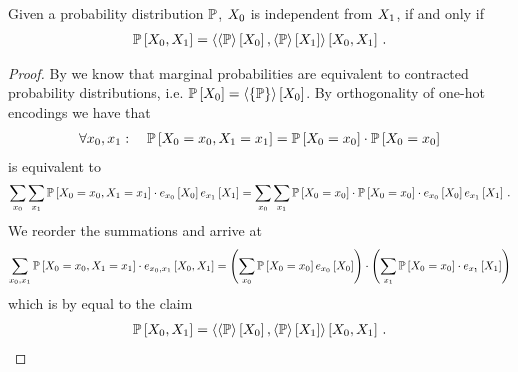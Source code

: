 \begin{theorem}\label{the:independenceProductCriterion}
	Given a probability distribution $\mathbb{P}$, $X_{0}$ is independent from $X_{1}$, if and only if 
	\begin{align*}
		\mathbb{P}\left[X_{0},X_{1}\right] 
		= \left\langle \left\langle \mathbb{P}\right\rangle \left[ X_{0} \right],\left\langle \mathbb{P}\right\rangle \left[ X_{1} \right]\right\rangle \left[ X_{0},X_{1} \right] \, . 
	\end{align*}
\end{theorem}
\begin{proof}
	By  we know that marginal probabilities are equivalent to contracted probability distributions, i.e. $\mathbb{P}\left[X_{0}\right] = \left\langle \{\mathbb{P}\}\right\rangle \left[ X_{0} \right] $.
	By orthogonality of one-hot encodings we have that
	\begin{align*}
		\forall x_{0}, x_{1} : \quad  \mathbb{P}\left[X_{0}=x_{0},X_{1}=x_{1}\right] 
		= \mathbb{P}\left[X_{0}=x_{0}\right]
		 \cdot 
		 \mathbb{P}\left[X_{0}=x_{0}\right]
	\end{align*}
	is equivalent to 
	\begin{align*}
		\sum_{x_{0}}\sum_{x_{1}} \mathbb{P}\left[X_{0}=x_{0},X_{1}=x_{1}\right] \cdot e_{x_{0}}\left[X_{0}\right]e_{x_{1}}\left[X_{1}\right]
		= \sum_{x_{0}}\sum_{x_{1}} 
		\mathbb{P}\left[X_{0}=x_{0}\right]
		 \cdot 
		 \mathbb{P}\left[X_{0}=x_{0}\right] \cdot e_{x_{0}}\left[X_{0}\right]e_{x_{1}}\left[X_{1}\right] \, .
	\end{align*}
	We reorder the summations and arrive at
	\begin{align*}
		\sum_{x_{0},x_{1}} 
		\mathbb{P}\left[X_{0}=x_{0},X_{1}=x_{1}\right] \cdot e_{x_{0},x_{1}}\left[X_{0}, X_{1}\right]
		= \left(\sum_{x_{0}}\mathbb{P}\left[X_{0}=x_{0}\right] e_{x_{0}}\left[X_{0}\right] \right)
		\cdot 
		\left( \sum_{x_{1}}  \mathbb{P}\left[X_{0}=x_{0}\right] \cdot e_{x_{1}}\left[X_{1}\right]  \right)
	\end{align*}
	which is by  equal to the claim
	\begin{align*}
		\mathbb{P}\left[X_{0},X_{1}\right] = \left\langle \left\langle \mathbb{P}\right\rangle \left[ X_{0} \right],\left\langle \mathbb{P}\right\rangle \left[ X_{1} \right]\right\rangle \left[ X_{0},X_{1} \right] \, . 
	\end{align*}
\end{proof}


